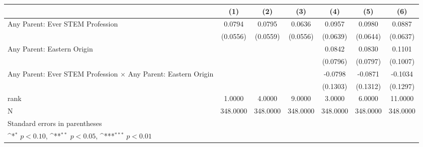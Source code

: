{
\def\sym#1{\ifmmode^{#1}\else\(^{#1}\)\fi}
\begin{tabular}{l*{6}{c}}
\toprule
                    &\multicolumn{1}{c}{(1)}         &\multicolumn{1}{c}{(2)}         &\multicolumn{1}{c}{(3)}         &\multicolumn{1}{c}{(4)}         &\multicolumn{1}{c}{(5)}         &\multicolumn{1}{c}{(6)}         \\
\midrule
Any Parent: Ever STEM Profession&      0.0794         &      0.0795         &      0.0636         &      0.0957         &      0.0980         &      0.0887         \\
                    &    (0.0556)         &    (0.0559)         &    (0.0556)         &    (0.0639)         &    (0.0644)         &    (0.0637)         \\
\addlinespace
Any Parent: Eastern Origin&                     &                     &                     &      0.0842         &      0.0830         &      0.1101         \\
                    &                     &                     &                     &    (0.0796)         &    (0.0797)         &    (0.1007)         \\
\addlinespace
Any Parent: Ever STEM Profession $\times$ Any Parent: Eastern Origin&                     &                     &                     &     -0.0798         &     -0.0871         &     -0.1034         \\
                    &                     &                     &                     &    (0.1303)         &    (0.1312)         &    (0.1297)         \\
\midrule
rank                &      1.0000         &      4.0000         &      9.0000         &      3.0000         &      6.0000         &     11.0000         \\
N                   &    348.0000         &    348.0000         &    348.0000         &    348.0000         &    348.0000         &    348.0000         \\
\bottomrule
\multicolumn{7}{l}{\footnotesize Standard errors in parentheses}\\
\multicolumn{7}{l}{\footnotesize \sym{*} \(p<0.10\), \sym{**} \(p<0.05\), \sym{***} \(p<0.01\)}\\
\end{tabular}
}
